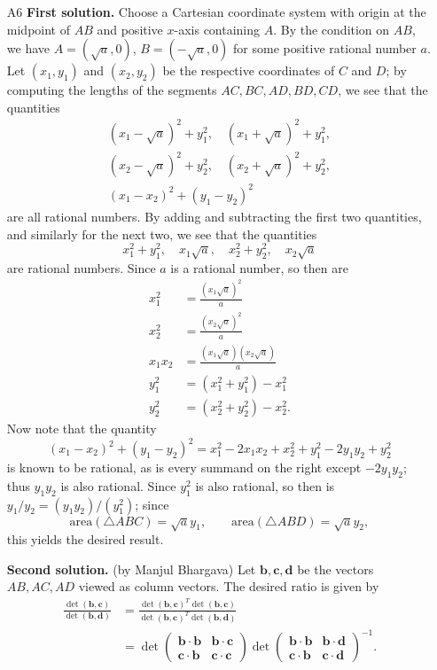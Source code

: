 \documentclass[amssymb,twocolumn,pra,10pt,aps]{revtex4-1}
\begin{document}
\begin{itemize}
\item[A6]
\textbf{First solution.}
Choose a Cartesian coordinate system with origin at the midpoint of $AB$ and positive $x$-axis containing $A$.
By the condition on $AB$, we have $A = (\sqrt{a}, 0)$, $B = (-\sqrt{a}, 0)$ for some positive rational number $a$.
Let $(x_1, y_1)$ and $(x_2, y_2)$ be the respective coordinates of $C$ and $D$; by computing the lengths
of the segments $AC, BC, AD, BD, CD$, we see that the quantities
\begin{gather*}
(x_1 - \sqrt{a})^2 + y_1^2, \quad (x_1 + \sqrt{a})^2 + y_1^2, \\
(x_2 - \sqrt{a})^2 + y_2^2, \quad (x_2 + \sqrt{a})^2 + y_2^2, \\
(x_1 - x_2)^2 + (y_1 - y_2)^2
\end{gather*}
are all rational numbers. By adding and subtracting the first two quantities, and similarly for the next two, we see that the quantities
\[
x_1^2 + y_1^2,\quad x_1 \sqrt{a}, \quad x_2^2 + y_2^2, \quad x_2 \sqrt{a}
\]
are rational numbers. Since $a$ is a rational number, so then are
\begin{align*}
x_1^2 &= \frac{(x_1 \sqrt{a})^2}{a} \\
x_2^2 &= \frac{(x_2 \sqrt{a})^2}{a} \\
x_1x_2 &= \frac{(x_1 \sqrt{a})(x_2 \sqrt{a})}{a} \\
y_1^2 &= (x_1^2 + y_1^2) - x_1^2 \\
y_2^2 &= (x_2^2 + y_2^2) - x_2^2.
\end{align*}
Now note that the quantity
\[
(x_1 - x_2)^2 + (y_1 - y_2)^2 = x_1^2 -2x_1 x_2 + x_2^2 + y_1^2 - 2y_1y_2 + y_2^2
\]
is known to be rational, as is every summand on the right except $-2y_1y_2$; thus $y_1y_2$ is also rational.
Since $y_1^2$ is also rational, so then is $y_1/y_2 = (y_1y_2)/(y_1^2)$;
since
\[
\mathrm{area}(\triangle ABC) = \sqrt{a} y_1, \qquad \mathrm{area}(\triangle ABD) = \sqrt{a} y_2,
\]
this yields the desired result.


\noindent
\textbf{Second solution.} (by Manjul Bhargava)
Let $\mathbf{b},\mathbf{c}, \mathbf{d}$ be the vectors $AB, AC, AD$ viewed as column vectors.
The desired ratio is given by
\begin{align*}
\frac{\det(\mathbf{b},\mathbf{c})}{\det(\mathbf{b},\mathbf{d})} &= \frac{\det(\mathbf{b},\mathbf{c})^T \det(\mathbf{b},\mathbf{c}) }{ \det(\mathbf{b},\mathbf{c})^T\det(\mathbf{b},\mathbf{d})} \\
&= \det \begin{pmatrix} \mathbf{b} \cdot \mathbf{b} & \mathbf{b} \cdot \mathbf{c} \\
\mathbf{c} \cdot \mathbf{b} & \mathbf{c} \cdot \mathbf{c}
\end{pmatrix}
\det \begin{pmatrix}
\mathbf{b} \cdot \mathbf{b} & \mathbf{b} \cdot \mathbf{d} \\
\mathbf{c} \cdot \mathbf{b} & \mathbf{c} \cdot \mathbf{d}
\end{pmatrix}^{-1}.
\end{align*}


\end{itemize}
\end{document}
